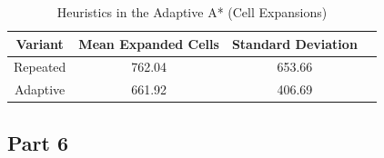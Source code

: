 \documentclass{article}
\begin{document}
\begin{table}[!h]
    \centering
    \small
    \begin{tabular}{cccc}
        \hline
         Variant & Mean Expanded Cells & Standard Deviation\\
         \hline
         Repeated & 762.04 & 653.66\\
         Adaptive & 661.92 & 406.69\\
        \hline
    \end{tabular}
    \caption{Heuristics in the Adaptive A* (Cell Expansions)}
    \label{tab:my_label}
\end{table}

\subsection*{Part 6}
\end{document}
